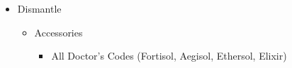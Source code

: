 \begin{paracol}{2}
\begin{upgrade}
\begin{itemize}
\begin{itemize}
\begin{itemize}
					                  \begin{itemize}
						                  \item Sturdy Bone x36 (Level 2, 3x EXP)
						                  \item Superconductor x17 (*)
					                  \end{itemize}
				            \end{itemize}
				      \item Accessories
				            \begin{itemize}
					            \item Warrior's Wristband Lv. 1
					                  \begin{itemize}
						                  \item Sturdy Bone x36 (3x EXP)
						                  \item Superconductor x37 (*)
					                  \end{itemize}
					            \item Warrior's Wristband Lv. 1
					                  \begin{itemize}
						                  \item Barbed Tail x36 (3x EXP)
						                  \item Particle Accelerator x3 (Level 10)
						                  \item Perfect Conductor x1 (*)
					                  \end{itemize}
					            \item Doctor's Codes (All)
					                  \begin{itemize}
						                  \item Barbed Tail x10 (*)
					                  \end{itemize}
				            \end{itemize}
			      \end{itemize}
			\item Dismantle
			      \begin{itemize}
				      \item Accessories
				            \begin{itemize}
					            \item All Doctor's Codes (Fortisol, Aegisol, Ethersol, Elixir)
				            \end{itemize}
			      \end{itemize}
		\end{itemize}
	\end{upgrade}
	\switchcolumn*


\end{paracol}
